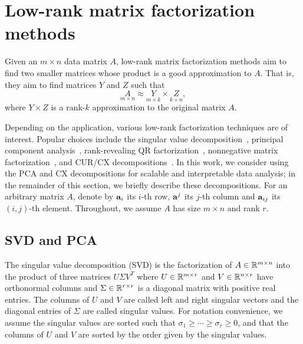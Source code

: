 \section{Low-rank matrix factorization methods}
\label{sxn:low-rank-methods}

Given an $m \times n$ data matrix $A$, low-rank matrix factorization methods
aim to find two smaller matrices whose product is a good approximation to $A$.
That is, they aim to find matrices $Y$ and $Z$ such that
\begin{equation}
 \label{eqn:apprx}
    \underset{m\times n}{A} \approx \underset{m\times k}{Y} \times \underset{k\times n}{Z} , 
\end{equation}
where $Y \times Z$ is a rank-$k$ approximation to the original matrix $A$.

Depending on the application, various low-rank factorization techniques are of
interest.  Popular choices include the singular value
decomposition~\cite{GVL96}, principal component analysis~\cite{pcaBook},
rank-revealing QR factorization~\cite{GE96}, nonnegative matrix
factorization~\cite{NMFalg}, and CUR/CX decompositions~\cite{CUR_PNAS}.  In
this work, we consider using the PCA and CX decompositions for scalable and
interpretable data analysis; in the remainder of this section, we briefly
describe these decompositions.
For an arbitrary matrix $A$, denote by $\mathbf{a}_i$
its $i$-th row, $\mathbf{a}^j$ its $j$-th column and $\mathbf{a}_{ij}$ its $(i,j)$-th element.
Throughout, we assume $A$ has size $m \times n$ and rank $r$.


\subsection{SVD and PCA}

The singular value decomposition (SVD) is the factorization of $A \in
\mathbb{R}^{m\times n}$ into the product of three matrices $U\Sigma V^T$ where $U
\in \mathbb{R}^{m\times r}$ and $V\in \mathbb{R}^{n\times r}$ have orthonormal columns
and $\Sigma\in \mathbb{R}^{r\times r}$ is a diagonal matrix with positive real
entries. The columns of $U$ and $V$ are called left and right singular vectors
and the diagonal entries of $\Sigma$ are called singular values.  For notation
convenience, we assume the singular values are sorted such that $\sigma_1\geq
\cdots \geq \sigma_r\geq 0$, and that the columns of $U$ and $V$ are
sorted by the order given by the singular values.  
 
